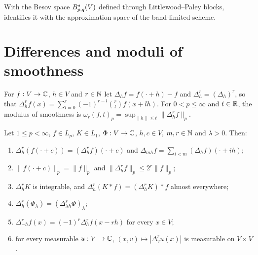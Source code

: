 With the Besov space $B^{s}_{p,q}(V)$ defined through Littlewood--Paley blocks,
 identifies it with the approximation space of the band-limited scheme.

\section{Differences and moduli of smoothness}

\begin{definition}
\label{def:rd-modulus}
\leanok
For $f : V \to \mathbb{C}$, $h \in V$ and $r \in \mathbb{N}$ let $\Delta_h f = f(\cdot + h) - f$ and
$\Delta_h^r = (\Delta_h)^r$, so that
$\Delta_h^r f(x) = \sum_{l=0}^r (-1)^{r-l} \binom{r}{l} f(x + l h)$. For $0 < p \leq \infty$ and
$t \in \mathbb{R}$, the modulus of smoothness is
$\omega_r(f, t)_p = \sup_{\|h\| \leq t} \|\Delta_h^r f\|_p$.
\end{definition}

\begin{lemma}
\label{lem:rd-differences}
\leanok
{}
Let $1 \leq p < \infty$, $f \in L_p$, $K \in L_1$, $\Phi : V \to \mathbb{C}$, $h, c \in V$, $m, r \in \mathbb{N}$
and $\lambda > 0$. Then:
\begin{enumerate}
  \item $\Delta_h^r (f(\cdot + c)) = (\Delta_h^r f)(\cdot + c)$ and
    $\Delta_{mh} f = \sum_{i<m} (\Delta_h f)(\cdot + i h)$;
  \item $\|f(\cdot + c)\|_p = \|f\|_p$ and $\|\Delta_h^r f\|_p \leq 2^r \|f\|_p$;
  \item $\Delta_h^r K$ is integrable, and $\Delta_h^r (K * f) = (\Delta_h^r K) * f$ almost
    everywhere;
  \item $\Delta_h^r (\Phi_\lambda) = (\Delta_{\lambda h}^r \Phi)_\lambda$;
  \item $\Delta_{-h}^r f(x) = (-1)^r \Delta_h^r f(x - r h)$ for every $x \in V$;
  \item for every measurable $u : V \to \mathbb{C}$, $(x, v) \mapsto |\Delta_v^r u(x)|$ is measurable on
    $V \times V$.
\end{enumerate}
\end{lemma}

